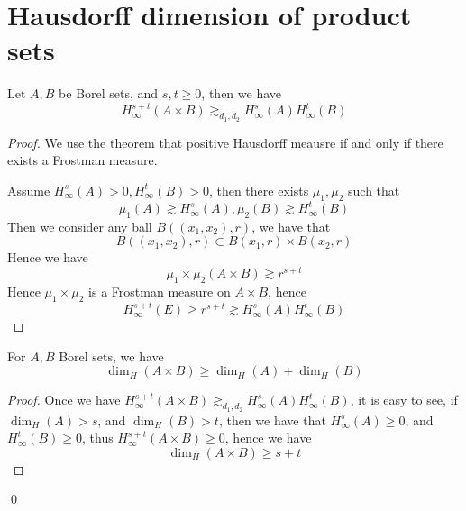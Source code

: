 \section{Hausdorff dimension of product sets}
\begin{theorem}
    Let $A,B$ be Borel sets, and $s,t\geq 0$, then we have
    \begin{equation*}
        H_\infty^{s+t}(A\times B)\gtrsim_{d_1, d_2}H_\infty^s(A)H_\infty^t(B)
    \end{equation*}
\end{theorem}
\begin{proof}
    We use the theorem that positive Hausdorff meausre if and only if there exists a Frostman measure.
    
    Assume $H_\infty^s(A)>0, H_\infty^t(B)>0$, then there exists $\mu_1, \mu_2$ such that 
    \begin{equation*}
        \mu_1(A)\gtrsim H_\infty^s(A), \mu_2(B)\gtrsim H_\infty^t(B)
    \end{equation*}
    Then we consider any ball $B((x_1, x_2), r)$, we have that
    \begin{equation*}
        B((x_1, x_2), r)\subset B(x_1, r)\times B(x_2, r)
    \end{equation*}
    Hence we have
    \begin{equation*}
        \mu_1\times\mu_2(A\times B)\gtrsim r^{s+t}
    \end{equation*}
    Hence $\mu_1\times\mu_2$ is a Frostman measure on $A\times B$, hence 
    \begin{equation*}
        H_\infty^{s+t}(E)\geq r^{s+t}\gtrsim H_\infty^s(A)H_\infty^t(B)
    \end{equation*}

\end{proof}
\begin{corollary}
    For $A,B$ Borel sets, we have
    \begin{equation*}
        \dim_H(A\times B)\geq \dim_H(A)+\dim_H(B)
    \end{equation*}
\end{corollary}
\begin{proof}
    Once we have $ H_\infty^{s+t}(A\times B)\gtrsim_{d_1, d_2}H_\infty^s(A)H_\infty^t(B)$, it is easy to see, if $\dim_H(A)> s$, and $\dim_H(B)>t$, then we have that $H_\infty^s(A)\geq 0$, and $H_\infty^t(B)\geq 0$, thus $H_\infty^{s+t}(A\times B)\geq 0$, hence we have
    \begin{equation*}
        \dim_H(A\times B)\geq s+t
    \end{equation*}
\end{proof}
\qed

